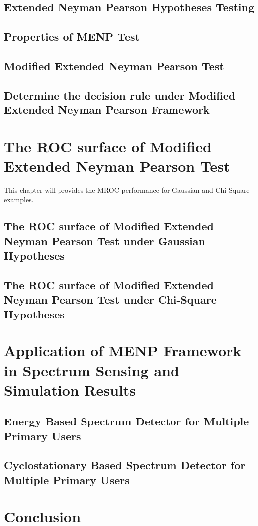 \documentclass{article}
\begin{document}
\begin{spacing}{2.0}
\subsection{Extended Neyman Pearson Hypotheses Testing}
\subsection{Properties of MENP Test}
\subsection{Modified Extended Neyman Pearson Test}
\subsection{Determine the decision rule under Modified Extended Neyman Pearson Framework}
\newpage
\section{The ROC surface of Modified Extended Neyman Pearson Test}
This chapter will provides the MROC performance for Gaussian and Chi-Square examples. 
\subsection{The ROC surface of Modified Extended Neyman Pearson Test under Gaussian Hypotheses}
\subsection{The ROC surface of Modified Extended Neyman Pearson Test under Chi-Square Hypotheses}
\newpage
\section{Application of MENP Framework in Spectrum Sensing and Simulation Results}
\subsection{Energy Based Spectrum Detector for Multiple Primary Users}
\subsection{Cyclostationary Based Spectrum Detector for Multiple Primary Users}
\newpage
\section{ Conclusion}
\newpage
\end{spacing}
\end{document}
